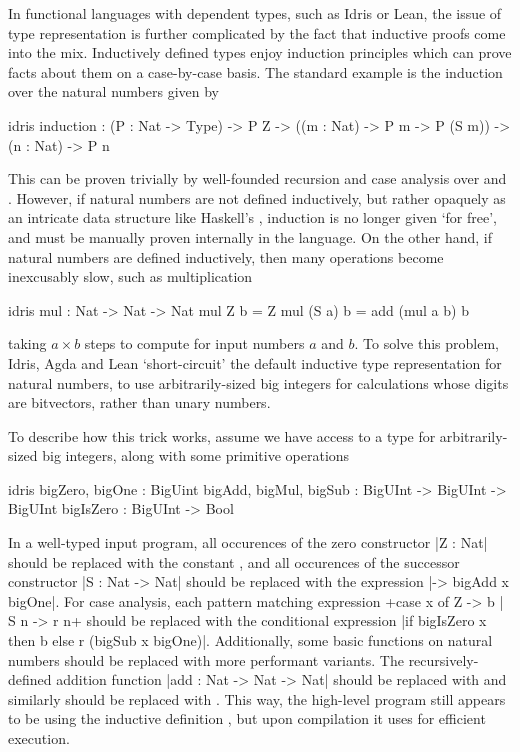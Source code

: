 In functional languages with dependent types, such as Idris or Lean, the issue
of type representation is further complicated by the fact that inductive proofs
come into the mix. Inductively defined types enjoy induction principles which
can prove facts about them on a case-by-case basis. The standard example is the
induction over the natural numbers  given by
\begin{bminted}{idris}
  induction : (P : Nat -> Type) -> P Z -> ((m : Nat) -> P m -> P (S m)) -> (n : Nat) -> P n
\end{bminted}
This can be proven trivially by well-founded recursion and case analysis over
 and . However, if
natural numbers are not defined inductively, but rather opaquely as an
intricate data structure like Haskell's , induction is no longer
given `for free', and must be manually proven internally in the language. On
the other hand, if natural numbers are defined inductively, then many
operations become inexcusably slow, such as multiplication
\begin{bminted}{idris}
  mul : Nat -> Nat -> Nat
  mul Z b = Z
  mul (S a) b = add (mul a b) b
\end{bminted}
taking $a \times b$ steps to compute for input numbers $a$ and $b$. To solve
this problem, Idris, Agda and Lean `short-circuit' the default inductive type
representation for natural numbers, to use arbitrarily-sized big integers for
calculations whose digits are bitvectors, rather than unary numbers.

To describe how this trick works, assume we have access to a type 
for arbitrarily-sized big integers, along with some primitive operations
\begin{bminted}{idris}
  bigZero, bigOne : BigUint
  bigAdd, bigMul, bigSub : BigUInt -> BigUInt -> BigUInt
  bigIsZero : BigUInt -> Bool
\end{bminted}
In a well-typed input program, all occurences of the zero constructor \idr|Z : Nat|
should be replaced with the constant , and all occurences of the
successor constructor \idr|S : Nat -> Nat| should be replaced with the expression
\idr|\x -> bigAdd x bigOne|. For case analysis, each pattern matching expression
\idr+case x of Z -> b | S n -> r n+ should be replaced with the conditional
expression \idr|if bigIsZero x then b else r (bigSub x bigOne)|. Additionally,
some basic functions on natural numbers should be replaced with more performant
variants. The recursively-defined addition function \idr|add : Nat -> Nat -> Nat|
should be replaced with  and similarly  should be replaced with
.
This way, the high-level program still appears to be using the inductive definition
, but upon compilation it uses  for efficient execution.

